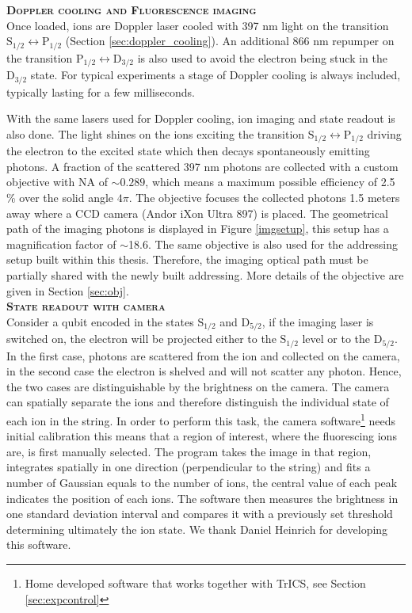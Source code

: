 \textbf{\textsc{Doppler cooling and Fluorescence imaging}}\\
Once loaded, ions are Doppler laser cooled with 397 nm light on the transition $\text{S}_{1/2} \leftrightarrow \text{P}_{1/2}$ (Section \ref{sec:doppler_cooling}). An additional 866 nm repumper on the transition $\text{P}_{1/2} \leftrightarrow \text{D}_{3/2}$ is also used to avoid the electron being stuck in the $\text{D}_{3/2}$ state. For typical experiments a stage of Doppler cooling is always included, typically lasting for a few milliseconds.\par
With the same lasers used for Doppler cooling, ion imaging and state readout is also done. The light shines on the ions exciting the transition $\text{S}_{1/2} \leftrightarrow \text{P}_{1/2}$ driving the electron to the excited state which then decays spontaneously emitting photons. A fraction of the scattered 397 nm photons are collected with a custom objective with NA of $\sim 0.289$, which means a maximum possible efficiency of 2.5 \% over the solid angle $4\pi$. The objective focuses the collected photons 1.5 meters away where a CCD camera (Andor iXon Ultra 897) is placed. The geometrical path of the imaging photons is displayed in Figure \ref{imgsetup}, this setup has a magnification factor of $\sim$18.6. The same objective is also used for the addressing setup built within this thesis. Therefore, the imaging optical path must be partially shared with the newly built addressing. More details of the objective are given in Section \ref{sec:obj}.\vspace{.5em}\\
\textbf{\textsc{State readout with camera}}\\
Consider a qubit encoded in the states $\text{S}_{1/2}$ and $\text{D}_{5/2}$, if the imaging laser is switched on, the electron will be projected either to the $\text{S}_{1/2}$ level or to the $\text{D}_{5/2} $. In the first case, photons are scattered from the ion and collected on the camera, in the second case the electron is shelved and will not scatter any photon. Hence, the two cases are distinguishable by the brightness on the camera. The camera can spatially separate the ions and therefore distinguish the individual state of each ion in the string. In order to perform this task, the camera software\footnote{Home developed software that works together with TrICS, see Section \ref{sec:expcontrol}} needs initial calibration this means that a region of interest, where the fluorescing ions are, is first manually selected. The program takes the image in that region, integrates spatially in one direction (perpendicular to the string) and fits a number of Gaussian equals to the number of ions, the central value of each peak indicates the position of each ions. The software then measures the brightness in one standard deviation interval and compares it with a previously set threshold determining ultimately the ion state. We thank Daniel Heinrich for developing this software.

